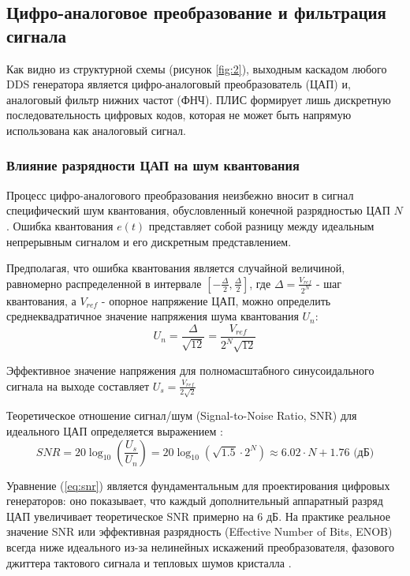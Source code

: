 \documentclass[12pt,a4paper,TimesNewRoman]{article}
\begin{document}
\subsection{Цифро-аналоговое преобразование и фильтрация сигнала}

Как видно из структурной схемы (рисунок \ref{fig:2}), выходным каскадом любого DDS генератора является цифро-аналоговый преобразователь (ЦАП) и, аналоговый фильтр нижних частот (ФНЧ). ПЛИС формирует лишь дискретную последовательность цифровых кодов, которая не может быть напрямую использована как аналоговый сигнал.

\subsubsection{Влияние разрядности ЦАП на шум квантования}

Процесс цифро-аналогового преобразования неизбежно вносит в сигнал специфический шум квантования, обусловленный конечной разрядностью ЦАП $N$. Ошибка квантования $e(t)$ представляет собой разницу между идеальным непрерывным сигналом и его дискретным представлением.

Предполагая, что ошибка квантования является случайной величиной, равномерно распределенной в интервале $\left[-\frac{\Delta}{2}, \frac{\Delta}{2}\right]$, где $\Delta=\frac{V_{ref}}{2^N}$ - шаг квантования, а $V_{ref}$ - опорное напряжение ЦАП, можно определить среднеквадратичное значение напряжения шума квантования $U_n$:
\begin{equation} \label{eq:noise_rms}
U_n = \frac{\Delta}{\sqrt{12}} = \frac{V_{ref}}{2^N \sqrt{12}}
\end{equation}

Эффективное значение напряжения для полномасштабного синусоидального сигнала на выходе составляет $U_s = \frac{V_{ref}}{2\sqrt{2}}$

Теоретическое отношение сигнал/шум (Signal-to-Noise Ratio, SNR) для идеального ЦАП определяется выражением \cite{analog-dds}:
\begin{equation} \label{eq:snr}
    SNR = 20 \log_{10}\left(\frac{U_s}{U_n}\right) = 20 \log_{10}\left(\sqrt{1.5} \cdot 2^N\right) \approx 6.02 \cdot N + 1.76 \text{ (дБ)}
\end{equation}

Уравнение (\ref{eq:snr}) является фундаментальным для проектирования цифровых генераторов: оно показывает, что каждый дополнительный аппаратный разряд ЦАП увеличивает теоретическое SNR примерно на 6 дБ. На практике реальное значение SNR или эффективная разрядность (Effective Number of Bits, ENOB) всегда ниже идеального из-за нелинейных искажений преобразователя, фазового джиттера тактового сигнала и тепловых шумов кристалла \cite{analog-dds}.
\end{document}
